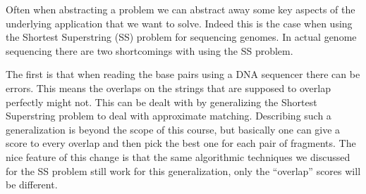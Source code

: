 \begin{cluster}
\label{grp:grm:genome::abstraction-versus-reality}

\begin{gram}
\label{grm:genome::abstraction-versus-reality}
Often when abstracting a problem we can abstract away some key aspects
of the underlying application that we want to solve.  Indeed this is
the case when using the Shortest Superstring (SS) problem for
sequencing genomes.  In actual genome sequencing there are two
shortcomings with using the SS problem.

\end{gram}
\end{cluster}

\begin{cluster}
\label{grp:grm:genome::reading}

\begin{gram}
\label{grm:genome::reading}
The first is that when reading the base pairs using a DNA sequencer
there can be errors.  This means the overlaps on the strings that are
supposed to overlap perfectly might not.  This can be dealt with by
generalizing the Shortest Superstring problem to deal with approximate
matching.  Describing such a generalization is beyond the scope of
this course, but basically one can give a score to every overlap and
then pick the best one for each pair of fragments.  The nice feature
of this change is that the same algorithmic techniques we discussed
for the SS problem still work for this generalization, only the
``overlap'' scores will be different.

\end{gram}
\end{cluster}

